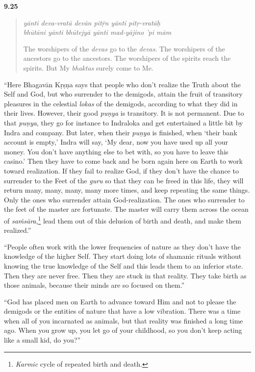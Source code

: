 \par\noindent\textbf{9.25}\par
\begin{verse}
\textit{yānti deva-vratā devān pitṝn yānti pitṛ-vratāḥ} \\
\textit{bhūtāni yānti bhūtejyā yānti mad-yājino ’pi mām}

\noindent The worshipers of the \textit{devas} go to the \textit{devas}. The worshipers of the ancestors go to the ancestors. The worshipers of the spirits reach the spirits. But My \textit{bhaktas} surely come to Me.
\end{verse}
\par


\enquote{Here Bhagavān Kṛṣṇa says that people who don’t realize the Truth about the Self and God, but who surrender to the demigods, attain the fruit of transitory pleasures in the celestial \textit{lokas} of the demigods, according to what they did in their lives. However, their good \textit{puṇya} is transitory. It is not permanent. Due to that \textit{puṇya}, they go for instance to Indraloka and get entertained a little bit by Indra and company. But later, when their \textit{puṇya} is finished, when \enquote{their bank account is empty,} Indra will say, \enquote{My dear, now you have used up all your money. You don’t have anything else to bet with, so you have to leave this casino.} Then they have to come back and be born again here on Earth to work toward realization. If they fail to realize God, if they don’t have the chance to surrender to the Feet of the \textit{guru} so that they can be freed in this life, they will return many, many, many, many more times, and keep repeating the same things. Only the ones who surrender attain God-realization. The ones who surrender to the feet of the master are fortunate. The master will carry them across the ocean of \textit{saṁsāra},\footnote{\textit{Karmic} cycle of repeated birth and death.} lead them out of this delusion of birth and death, and make them realized.}

\enquote{People often work with the lower frequencies of nature as they don’t have the knowledge of the higher Self. They start doing lots of shamanic rituals without knowing the true knowledge of the Self and this leads them to an inferior state. Then they are never free. Then they are stuck in that reality. They take birth as those animals, because their minds are so focused on them.}

\enquote{God has placed men on Earth to advance toward Him and not to please the demigods or the entities of nature that have a low vibration. There was a time when all of you incarnated as animals, but that reality was finished a long time ago. When you grow up, you let go of your childhood, so you don’t keep acting like a small kid, do you?}

